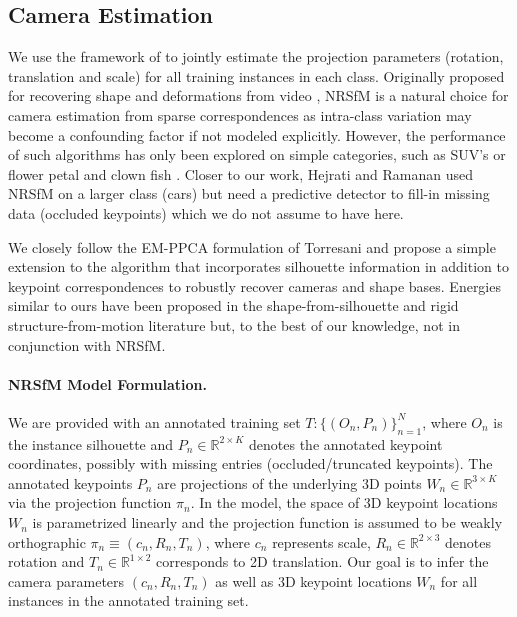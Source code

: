 \subsection{Camera Estimation}
We use the framework of \nrsfm \cite{Bregler2000} to jointly estimate the projection parameters (rotation, translation and scale) for all training instances in each class. Originally proposed for recovering shape and deformations from video \cite{nrsfm_priors,Torresani2008NRSFM,varnrsfm2013,Bregler2000}, NRSfM is a natural choice for camera estimation from sparse correspondences as intra-class variation may become a confounding factor if not modeled explicitly. However, the performance of such algorithms has only been explored on simple categories, such as SUV's \cite{Zhu_ModelEvolution:2010} or flower petal and clown fish \cite{prasad2010finding}. Closer to our work, Hejrati and Ramanan \cite{HejratiR12} used NRSfM on a larger class (cars) but need a predictive detector to fill-in missing data (occluded keypoints) which we do not assume to have here.


We closely follow the EM-PPCA formulation of Torresani \etal\cite{Torresani2008NRSFM} and propose a simple extension to the algorithm that incorporates silhouette information in addition to keypoint correspondences to robustly recover cameras and shape bases. Energies similar to ours have been proposed in the shape-from-silhouette  \cite{balloonshapes} and rigid structure-from-motion \cite{carvi14} literature but, to the best of our knowledge, not in conjunction with NRSfM.

\paragraph{NRSfM Model Formulation.} We are provided with an annotated training set $T:\{(O_n, P_n)\}_{n=1}^N$, where $O_n$ is the instance silhouette and $P_n \in \mathbb{R}^{2 \times K}$ denotes the annotated keypoint coordinates, possibly with missing entries (occluded/truncated keypoints). The annotated keypoints $P_n$ are  projections of the underlying 3D points $W_n \in \mathbb{R}^{3 \times K}$ via the projection function $\pi_n$. In the \nrsfm model, the space of 3D keypoint locations $W_n$ is parametrized linearly and the projection function is assumed to be weakly orthographic \ie $\pi_n \equiv (c_n, R_n, T_n)$, where $c_n$ represents scale, $R_n \in \mathbb{R}^{2 \times 3}$ denotes rotation and $T_n \in \mathbb{R}^{1 \times 2}$ corresponds to 2D translation. Our goal is to infer the camera parameters $(c_n, R_n, T_n)$ as well as 3D keypoint locations $W_n$ for all instances in the annotated training set.

